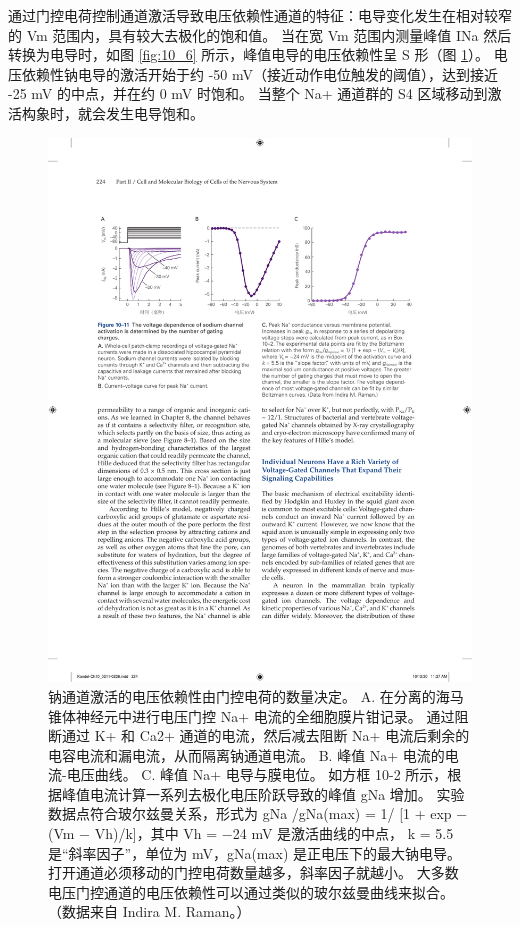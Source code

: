 通过门控电荷控制通道激活导致电压依赖性通道的特征：电导变化发生在相对较窄的 Vm 范围内，具有较大去极化的饱和值。 
当在宽 Vm 范围内测量峰值 INa 然后转换为电导时，如图 \ref{fig:10_6} 所示，峰值电导的电压依赖性呈 S 形（图 \ref{fig:10_11}）。 
电压依赖性钠电导的激活开始于约 -50 mV（接近动作电位触发的阈值），达到接近 -25 mV 的中点，并在约 0 mV 时饱和。 
当整个 Na+ 通道群的 S4 区域移动到激活构象时，就会发生电导饱和。

\begin{figure}[htbp]
	\centering
	\includegraphics[width=0.9\linewidth]{chap10/fig_10_11}
	\caption{钠通道激活的电压依赖性由门控电荷的数量决定。 A. 在分离的海马锥体神经元中进行电压门控 Na+ 电流的全细胞膜片钳记录。 通过阻断通过 K+ 和 Ca2+ 通道的电流，然后减去阻断 Na+ 电流后剩余的电容电流和漏电流，从而隔离钠通道电流。 B. 峰值 Na+ 电流的电流-电压曲线。 C. 峰值 Na+ 电导与膜电位。 如方框 10-2 所示，根据峰值电流计算一系列去极化电压阶跃导致的峰值 gNa 增加。 实验数据点符合玻尔兹曼关系，形式为 gNa /gNa(max) = 1/ [1 + exp − (Vm − Vh)/k]，其中 Vh = −24 mV 是激活曲线的中点， k = 5.5 是“斜率因子”，单位为 mV，gNa(max) 是正电压下的最大钠电导。 打开通道必须移动的门控电荷数量越多，斜率因子就越小。 大多数电压门控通道的电压依赖性可以通过类似的玻尔兹曼曲线来拟合。 （数据来自 Indira M. Raman。）}
	\label{fig:10_11}
\end{figure}


